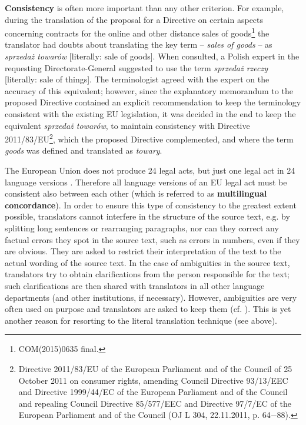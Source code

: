 \documentclass[output=paper]{langsci/langscibook}
\begin{document}
\textbf{Consistency} is often more important than any other criterion. For example, during the translation of the proposal for a Directive on certain aspects concerning contracts for the online and other distance sales of goods\footnote{COM(2015)0635 final.} the translator had doubts about translating the key term – \textit{sales of goods} – as \textit{sprzedaż towarów} [literally: sale of goods]. When consulted, a Polish expert in the requesting Directorate-General suggested to use the term \textit{sprzedaż rzeczy} [literally: sale of things]. The terminologist agreed with the expert on the accuracy of this equivalent; however, since the explanatory memorandum to the proposed Directive contained an explicit recommendation to keep the terminology consistent with the existing EU legislation, it was decided in the end to keep the equivalent \textit{sprzedaż towarów}, to maintain consistency with Directive 2011/83/EU\footnote{Directive 2011/83/EU of the European Parliament and of the Council of 25 October 2011 on consumer rights, amending Council Directive 93/13/EEC and Directive 1999/44/EC of the European Parliament and of the Council and repealing Council Directive 85/577/EEC and Directive 97/7/EC of the European Parliament and of the Council (OJ L 304, 22.11.2011, p. 64$-$88).}, which the proposed Directive complemented, and where the term \textit{goods} was defined and translated as \textit{towary}.

The European Union does not produce 24 legal acts, but just one legal act in 24 language versions \citep[119-120]{Doczekalska2009production}. Therefore all language versions of an EU legal act must be consistent also between each other (which is referred to as \textbf{multilingual concordance}). In order to ensure this type of consistency to the greatest extent possible, translators cannot interfere in the structure of the source text, e.g. by splitting long sentences or rearranging paragraphs, nor can they correct any factual errors they spot in the source text, such as errors in numbers, even if they are obvious. They are asked to restrict their interpretation of the text to the actual wording of the source text. In the case of ambiguities in the source text, translators try to obtain clarifications from the person responsible for the text; such clarifications are then shared with translators in all other language departments (and other institutions, if necessary). However, ambiguities are very often used on purpose and translators are asked to keep them (cf. \citealt[92–93]{Šarčević1997}). This is yet another reason for resorting to the literal translation technique (see above).
\end{document}
